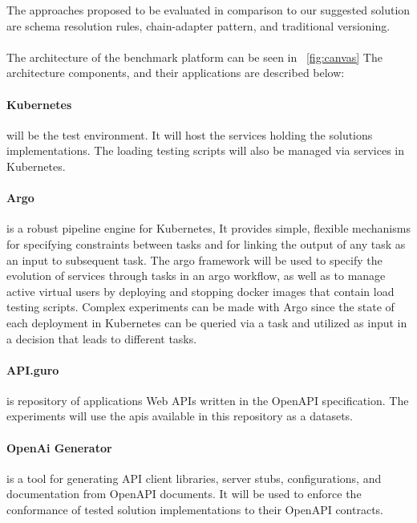 The approaches proposed to be evaluated in comparison to our suggested solution are schema resolution rules, chain-adapter pattern, and traditional versioning.

\paragraph{}

The architecture of the benchmark platform can be seen in ~\ref{fig:canvas}
The architecture components, and their applications are described below:

\paragraph{Kubernetes} will be the test environment.
It will host the services holding the solutions implementations.
The loading testing scripts will also be managed via services in Kubernetes.

\paragraph{Argo} is a robust pipeline engine for Kubernetes, It provides simple, flexible mechanisms for specifying constraints
between tasks and for linking the output of any task as an input to subsequent task.
The argo framework will be used to specify the evolution of services through tasks in an argo workflow,
as well as to manage active virtual users by deploying and stopping docker images that contain load testing scripts.
Complex experiments can be made with Argo since the state of each deployment in Kubernetes can be queried via a task
and utilized as input in a decision that leads to different tasks.

\paragraph{API.guro} is repository of applications Web APIs written in the OpenAPI specification.
The experiments will use the apis available in this repository as a datasets.

\paragraph{OpenAi Generator} is a tool for generating API client libraries, server stubs, configurations, and documentation from OpenAPI documents.
It will be used to enforce the conformance of tested solution implementations to their OpenAPI contracts.

